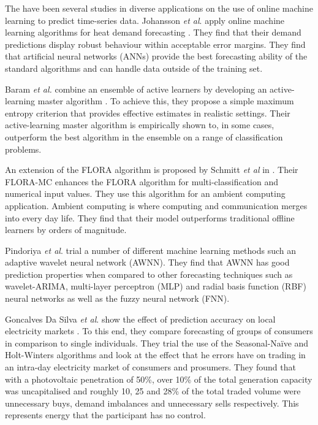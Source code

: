\documentclass[final,3p,times,twocolumn,numbers]{elsarticle}
\begin{document}
The have been several studies in diverse applications on the use of online machine learning to predict time-series data. Johansson \textit{et al}. apply online machine learning algorithms for heat demand forecasting \cite{Johansson2017}. They find that their demand predictions display robust behaviour within acceptable error margins. They find that artificial neural networks (ANNs) provide the best forecasting ability of the standard algorithms and can handle data outside of the training set.

Baram \textit{et al.} combine an ensemble of active learners by developing an active-learning master algorithm \cite{Baram2003}. To achieve this, they propose a simple maximum entropy criterion that provides effective estimates in realistic settings. Their active-learning master algorithm is empirically shown to, in some cases, outperform the best algorithm in the ensemble on a range of classification problems.

An extension of the FLORA algorithm is proposed by Schmitt \textit{et al} in \cite{Schmitt2008}. Their FLORA-MC enhances the FLORA algorithm for multi-classification and numerical input values. They use this algorithm for an ambient computing application. Ambient computing is where computing and communication merges into every day life. They find that their model outperforms traditional offline learners by orders of magnitude.

Pindoriya \textit{et al}. trial a number of different machine learning methods such an adaptive wavelet neural network (AWNN). They find that AWNN has good prediction properties when compared to other forecasting techniques such as wavelet-ARIMA, multi-layer perceptron (MLP) and radial basis function (RBF) neural networks as well as the fuzzy neural network (FNN).


Goncalves Da Silva \textit{et al}. show the effect of prediction accuracy on local electricity markets \cite{GoncalvesDaSilva2014}. To this end, they compare forecasting of groups of consumers in comparison to single individuals. They trial the use of the Seasonal-Naïve and Holt-Winters algorithms and look at the effect that he errors have on trading in an intra-day electricity market of consumers and prosumers. They found that with a photovoltaic penetration of 50\%, over 10\% of the total generation capacity was uncapitalised and roughly 10, 25 and 28\% of the total traded volume were unnecessary buys, demand imbalances and unnecessary sells respectively. This represents energy that the participant has no control.
\end{document}
